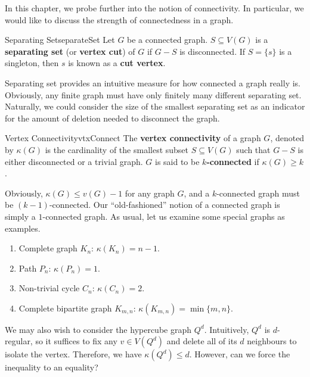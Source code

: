 \documentclass[math]{amznotes}
\theoremstyle{remark}
\newcommand{\0}{\mathbf{0}}
\newcommand{\1}{\mathbf{1}}
\begin{document}
In this chapter, we probe further into the notion of connectivity. In particular, we would like to discuss the strength of connectedness in a graph.
\begin{dfnbox}{Separating Set}{separateSet}
    Let $G$ be a connected graph. $S \subseteq V(G)$ is a {\color{red} \textbf{separating set}} (or {\color{red} \textbf{vertex cut}}) of $G$ if $G - S$ is disconnected. If $S = \{s\}$ is a singleton, then $s$ is known as a {\color{red} \textbf{cut vertex}}.
\end{dfnbox}
Separating set provides an intuitive measure for how connected a graph really is. Obviously, any finite graph must have only finitely many different separating set. Naturally, we could consider the size of the smallest separating set as an indicator for the amount of deletion needed to disconnect the graph.
\begin{dfnbox}{Vertex Connectivity}{vtxConnect}
    The {\color{red} \textbf{vertex connectivity}} of a graph $G$, denoted by $\kappa(G)$ is the cardinality of the smallest subset $S \subseteq V(G)$ such that $G - S$ is either disconnected or a trivial graph. $G$ is said to be {\color{red} \textbf{$k$-connected}} if $\kappa(G) \geq k$.
\end{dfnbox}
Obviously, $\kappa(G) \leq v(G) - 1$ for any graph $G$, and a $k$-connected graph must be $(k - 1)$-connected. Our ``old-fashioned'' notion of a connected graph is simply a $1$-connected graph. As usual, let us examine some special graphs as examples.
\begin{enumerate}
    \item Complete graph $K_n$: $\kappa(K_n) = n - 1$.
    \item Path $P_n$: $\kappa(P_n) = 1$.
    \item Non-trivial cycle $C_n$: $\kappa(C_n) = 2$.
    \item Complete bipartite graph $K_{m, n}$: $\kappa(K_{m, n}) = \min\{m, n\}$.
\end{enumerate}
We may also wish to consider the hypercube graph $Q^d$. Intuitively, $Q^d$ is $d$-regular, so it suffices to fix any $v \in V\left(Q^d\right)$ and delete all of its $d$ neighbours to isolate the vertex. Therefore, we have $\kappa\left(Q^d\right) \leq d$. However, can we force the inequality to an equality?
\end{document}
